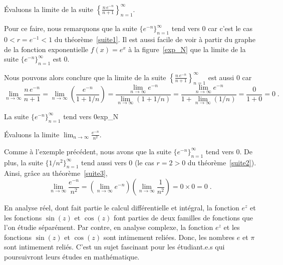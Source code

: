 {\begin{egg}
Évaluons la limite de la suite
$\displaystyle \left\{\frac{n\,e^{-n}}{n+1}\right\}_{n=1}^\infty$.

Pour ce faire, nous remarquons que la suite
$\displaystyle \{ e^{-n} \}_{n=1}^\infty$ tend vers $0$ car c'est le
cas $0< r = e^{-1}<1$ du théorème~\ref{suite1}.  Il est aussi facile
de voir à partir du graphe de la fonction exponentielle $f(x)=e^x$
à la figure~\ref{exp_N} que la limite de la suite
$\displaystyle \{ e^{-n}\}_{n=1}^\infty$ est $0$. 

Nous pouvons alors conclure que la limite de la suite
$\displaystyle \left\{\frac{n\,e^{-n}}{n+1}\right\}_{n=1}^\infty$ est
aussi $0$ car
\[
\lim_{n\rightarrow \infty} \frac{n\, e^{-n}}{n+1}
= \lim_{n\rightarrow \infty} \left( \frac{e^{-n}}{1+1/n} \right)
= \frac{\displaystyle \lim_{n\rightarrow \infty} e^{-n}}
{\displaystyle \lim_{n\rightarrow \infty} \left(1 + 1/n\right)}
= \frac{\displaystyle \lim_{n\rightarrow \infty} e^{-n}}
{\displaystyle 1 + \lim_{n\rightarrow \infty} (1/n)}
= \frac{0}{1+0} = 0 \; .
\]
\end{egg}

{La suite $\{e^{-n}\}_{n=1}^\infty$ tend vers $0$}{exp_N}

\begin{egg}
Évaluons la limite
$\displaystyle \lim_{n\rightarrow \infty} \frac{e^{-n}}{n^2}$.

Comme à l'exemple précédent, nous avons que la suite
$\displaystyle \{ e^{-n} \}_{n=1}^\infty$ tend vers $0$.  De plus, la
suite $\displaystyle \{ 1/n^2 \}_{n=1}^\infty$ tend aussi vers $0$
(le cas $r=2>0$ du théorème~\ref{suite2}).  Ainsi, grâce au
théorème~\ref{suite3},
\[
\lim_{n\rightarrow \infty} \frac{e^{-n}}{n^2}
= \left(\lim_{n\rightarrow \infty} e^{-n} \right)
\left(\lim_{n\rightarrow \infty} \frac{1}{n^2}\right) = 0\times 0 = 0 \; .
\]
\end{egg}

\begin{rmk}[\theory]
En analyse réel, dont fait partie le calcul différentielle et intégral,
la fonction $e^z$ et les fonctions $\sin(z)$ et $\cos(z)$ font parties
de deux familles de fonctions que l'on étudie séparément.  Par contre,
en analyse complexe, la fonction $e^z$ et les fonctions $\sin(z)$ et
$\cos(z)$ sont intimement reliées.  Donc, les nombres $e$ et $\pi$
sont intimement reliés.  C'est un sujet fascinant pour les  
étudiant.e.s qui poursuivront leurs études en mathématique.
\end{rmk}

}
